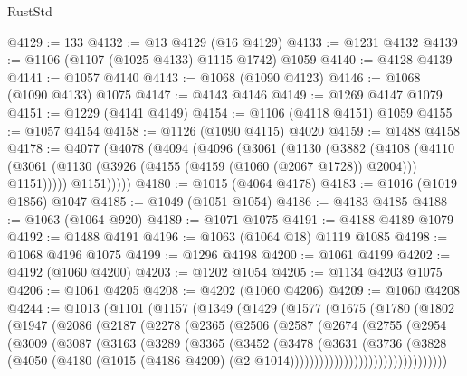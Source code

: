 \begin{lexlean}{RustStd}
\begin{coremodule}
@4129 := 133
@4132 := @13 @4129 (@16 @4129)
@4133 := @1231 @4132
@4139 := @1106 (@1107 (@1025 @4133) @1115 @1742) @1059
@4140 := @4128 @4139
@4141 := @1057 @4140
@4143 := @1068 (@1090 @4123)
@4146 := @1068 (@1090 @4133) @1075
@4147 := @4143 @4146
@4149 := @1269 @4147 @1079
@4151 := @1229 (@4141 @4149)
@4154 := @1106 (@4118 @4151) @1059
@4155 := @1057 @4154
@4158 := @1126 (@1090 @4115) @4020
@4159 := @1488 @4158
@4178 := @4077
    (@4078
      (@4094
        (@4096
          (@3061
            (@1130
              (@3882
                (@4108
                  (@4110
                    (@3061 (@1130 (@3926 (@4155 (@4159 (@1060 (@2067 @1728)) @2004))) @1151)))))
              @1151)))))
@4180 := @1015 (@4064 @4178)
@4183 := @1016 (@1019 @1856) @1047
@4185 := @1049 (@1051 @1054)
@4186 := @4183 @4185
@4188 := @1063 (@1064 @920)
@4189 := @1071 @1075
@4191 := @4188 @4189 @1079
@4192 := @1488 @4191
@4196 := @1063 (@1064 @18) @1119 @1085
@4198 := @1068 @4196 @1075
@4199 := @1296 @4198
@4200 := @1061 @4199
@4202 := @4192 (@1060 @4200)
@4203 := @1202 @1054
@4205 := @1134 @4203 @1075
@4206 := @1061 @4205
@4208 := @4202 (@1060 @4206)
@4209 := @1060 @4208
@4244 := @1013
    (@1101
      (@1157
        (@1349
          (@1429
            (@1577
              (@1675
                (@1780
                  (@1802
                    (@1947
                      (@2086
                        (@2187
                          (@2278
                            (@2365
                              (@2506
                                (@2587
                                  (@2674
                                    (@2755
                                      (@2954
                                        (@3009
                                          (@3087
                                            (@3163
                                              (@3289
                                                (@3365
                                                  (@3452
                                                    (@3478
                                                      (@3631
                                                        (@3736
                                                          (@3828
                                                            (@4050
                                                              (@4180
                                                                (@1015
                                                                  (@4186 @4209)
                                                                  (@2
                                                                    @1014))))))))))))))))))))))))))))))))

\end{coremodule}
\end{lexlean}
